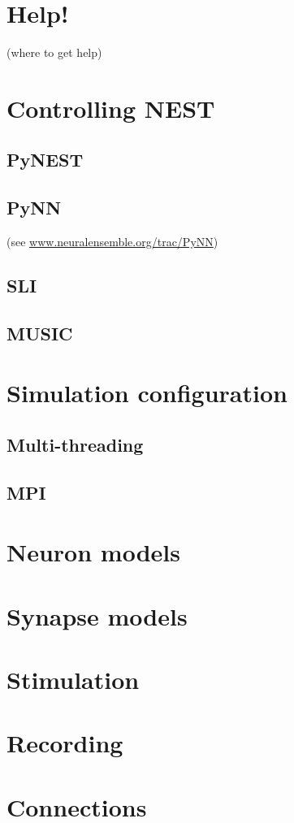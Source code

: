 \documentclass[a4paper,10pt]{report}
\begin{document}
\section{Help!}
(where to get help)
\section{Controlling NEST}
\subsection{PyNEST}
\citep{Eppler09_12}
\subsection{PyNN}
(see \href{http://www.neuralensemble.org/trac/PyNN}{www.neuralensemble.org/trac/PyNN})
\subsection{SLI}
\subsection{MUSIC}
\section{Simulation configuration}
\subsection{Multi-threading}
\subsection{MPI}
\section{Neuron models}
\section{Synapse models}
\section{Stimulation}
\section{Recording}
\section{Connections}
\end{document}
